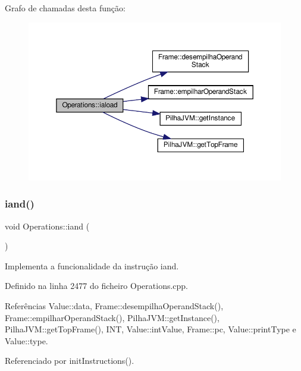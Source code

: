 Grafo de chamadas desta função\+:
\nopagebreak
\begin{figure}[H]
\begin{center}
\leavevmode
\includegraphics[width=350pt]{classOperations_a77f3b4c161fee7fbd6bb89b170400c0c_cgraph}
\end{center}
\end{figure}
\mbox{\label{classOperations_a8761c078ea80677ea82a43ab278e76b5}} 
\subsubsection{\texorpdfstring{iand()}{iand()}}
{\footnotesize\ttfamily void Operations\+::iand (\begin{DoxyParamCaption}{ }\end{DoxyParamCaption})\hspace{0.3cm}{\ttfamily [private]}}



Implementa a funcionalidade da instrução iand. 



Definido na linha 2477 do ficheiro Operations.\+cpp.



Referências Value\+::data, Frame\+::desempilha\+Operand\+Stack(), Frame\+::empilhar\+Operand\+Stack(), Pilha\+J\+V\+M\+::get\+Instance(), Pilha\+J\+V\+M\+::get\+Top\+Frame(), I\+NT, Value\+::int\+Value, Frame\+::pc, Value\+::print\+Type e Value\+::type.



Referenciado por init\+Instructions().

